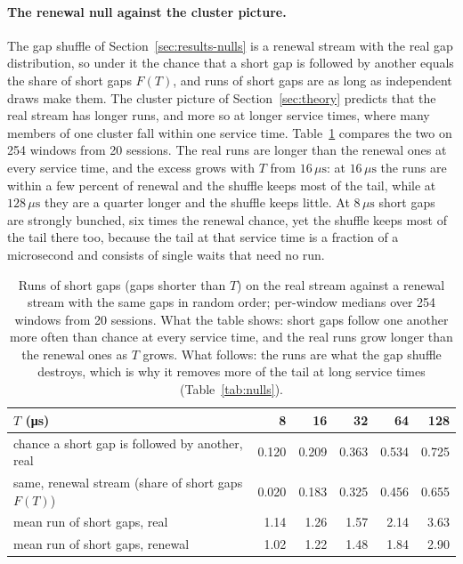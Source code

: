 \documentclass[11pt]{article}
\begin{document}
\paragraph{The renewal null against the cluster picture.} The gap shuffle of
Section~\ref{sec:results-nulls} is a renewal stream with the real gap distribution, so
under it the chance that a short gap is followed by another equals the share of short gaps
$F(T)$, and runs of short gaps are as long as independent draws make them. The cluster
picture of Section~\ref{sec:theory} predicts that the real stream has longer runs, and more
so at longer service times, where many members of one cluster fall within one service
time. Table~\ref{tab:renewal} compares the two on 254 windows from 20 sessions. The real
runs are longer than the renewal ones at every service time, and the excess grows with $T$
from $16\,\mu\mathrm{s}$: at $16\,\mu\mathrm{s}$ the runs are within a few percent of
renewal and the shuffle keeps most of the tail, while at $128\,\mu\mathrm{s}$ they are a
quarter longer and the shuffle keeps little. At $8\,\mu\mathrm{s}$ short gaps are strongly
bunched, six times the renewal chance, yet the shuffle keeps most of the tail there too,
because the tail at that service time is a fraction of a microsecond and consists of
single waits that need no run.

\begin{table}[H]
\centering
\small
\begin{tabular}{@{}lrrrrr@{}}
\toprule
$T$ (\si{\micro\second}) & 8 & 16 & 32 & 64 & 128 \\
\midrule
chance a short gap is followed by another, real      & 0.120 & 0.209 & 0.363 & 0.534 & 0.725 \\
same, renewal stream (share of short gaps $F(T)$)  & 0.020 & 0.183 & 0.325 & 0.456 & 0.655 \\
mean run of short gaps, real                          & 1.14 & 1.26 & 1.57 & 2.14 & 3.63 \\
mean run of short gaps, renewal                       & 1.02 & 1.22 & 1.48 & 1.84 & 2.90 \\
\bottomrule
\end{tabular}
\caption{Runs of short gaps (gaps shorter than $T$) on the real stream against a renewal
stream with the same gaps in random order; per-window medians over 254 windows from 20
sessions. What the table shows: short gaps follow one another more often than chance at
every service time, and the real runs grow longer than the renewal ones as $T$ grows. What
follows: the runs are what the gap shuffle destroys, which is why it removes more of the
tail at long service times (Table~\ref{tab:nulls}).}
\label{tab:renewal}
\end{table}
\end{document}
